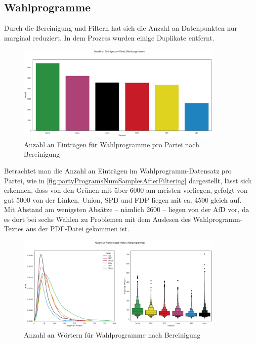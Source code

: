 \subsection*{Wahlprogramme}

Durch die Bereinigung und Filtern hat sich die Anzahl an Datenpunkten nur marginal reduziert. In dem Prozess wurden einige Duplikate entfernt.

\begin{figure}[H]
    \centering
    \includegraphics[width=0.9\textwidth]{data/images/party_programs/party_programs_num_samples_after_filter.png}
    \caption{Anzahl an Einträgen für Wahlprogramme pro Partei nach Bereinigung} \label{fig:partyProgramsNumSamplesAfterFiltering}
\end{figure}

Betrachtet man die Anzahl an Einträgen im Wahlprogramm-Datensatz pro Partei, wie in \autoref{fig:partyProgramsNumSamplesAfterFiltering} dargestellt, lässt sich erkennen, dass von den Grünen mit über \num{6000} am meisten vorliegen, gefolgt von gut \num{5000} von der Linken. Union, \ac{SPD} und \ac{FDP} liegen mit ca. \num{4500} gleich auf. Mit Abstand am wenigsten Absätze -- nämlich \num{2600} -- liegen von der \ac{AfD} vor, da es dort bei sechs Wahlen zu Problemen mit dem Auslesen des Wahlprogramm-Textes aus der \ac{PDF}-Datei gekommen ist.

\begin{figure}[H]
    \centering
    \includegraphics[width=0.9\textwidth]{data/images/party_programs/party_programs_word_count_after_filter.png}
    \caption{Anzahl an Wörtern für Wahlprogramme nach Bereinigung} \label{fig:partyProgramsWordCountsAfterFiltering}
\end{figure}

